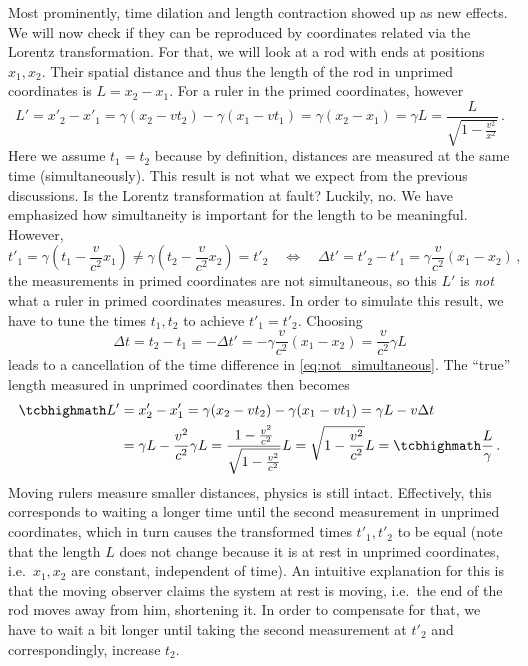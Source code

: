 Most prominently, time dilation and length contraction showed up as new effects. We will now check if they can be reproduced by coordinates related via the Lorentz transformation. For that, we will look at a rod with ends at positions $x_1, x_2$. Their spatial distance and thus the length of the rod in unprimed coordinates is $L = x_2 - x_1$. For a ruler in the primed coordinates, however
\begin{equation}
	L' = x'_2 - x'_1 = \gamma (x_2 - v t_2) - \gamma (x_1 - v t_1) = \gamma (x_2 - x_1) = \gamma L = \frac{L}{\sqrt{1 - \frac{v^2}{x^2}}} \, .
\end{equation}
Here we assume $t_1 = t_2$ because by definition, distances are measured at the same time (simultaneously). This result is not what we expect from the previous discussions. Is the Lorentz transformation at fault? Luckily, no. We have emphasized how simultaneity is important for the length to be meaningful. However,
\begin{equation}\label{eq:not_simultaneous}
	t'_1 = \gamma (t_1 - \frac{v}{c^2} x_1) \neq \gamma (t_2 - \frac{v}{c^2} x_2) = t'_2
	\quad \Leftrightarrow \quad
	\Delta t' = t'_2 - t'_1 = \gamma \frac{v}{c^2} (x_1 - x_2)
	\, ,
\end{equation}
the measurements in primed coordinates are not simultaneous, so this $L'$ is \emph{not} what a ruler in primed coordinates measures. In order to simulate this result, we have to tune the times $t_1, t_2$ to achieve $t'_1 = t'_2$. Choosing
\begin{equation}
	\Delta t = t_2 - t_1 = - \Delta t' = - \gamma \frac{v}{c^2} (x_1 - x_2) = \frac{v}{c^2} \gamma L
\end{equation}
leads to a cancellation of the time difference in \eqref{eq:not_simultaneous}. The \enquote{true} length measured in unprimed coordinates then becomes
\begin{equation}
	\begin{split}
	\eqbox{L'} &= x'_2 - x'_1 = \gamma (x_2 - v t_2) - \gamma (x_1 - v t_1) = \gamma L - v \Delta t
	\\
	&= \gamma L - \frac{v^2}{c^2} \gamma L = \frac{1 - \frac{v^2}{c^2}}{\sqrt{1 - \frac{v^2}{c^2}}} L = \sqrt{1 - \frac{v^2}{c^2}} L = \eqbox{\frac{L}{\gamma}} \, .
	\end{split}
\end{equation}
Moving rulers measure smaller distances, physics is still intact.
Effectively, this corresponds to waiting a longer time until the second measurement in unprimed coordinates, which in turn causes the transformed times $t'_1, t'_2$ to be equal (note that the length $L$ does not change because it is at rest in unprimed coordinates, i.e.~$x_1, x_2$ are constant, independent of time). An intuitive explanation for this is that the moving observer claims the system at rest is moving, i.e.~the end of the rod moves away from him, shortening it. In order to compensate for that, we have to wait a bit longer until taking the second measurement at $t'_2$ and correspondingly, increase $t_2$.

